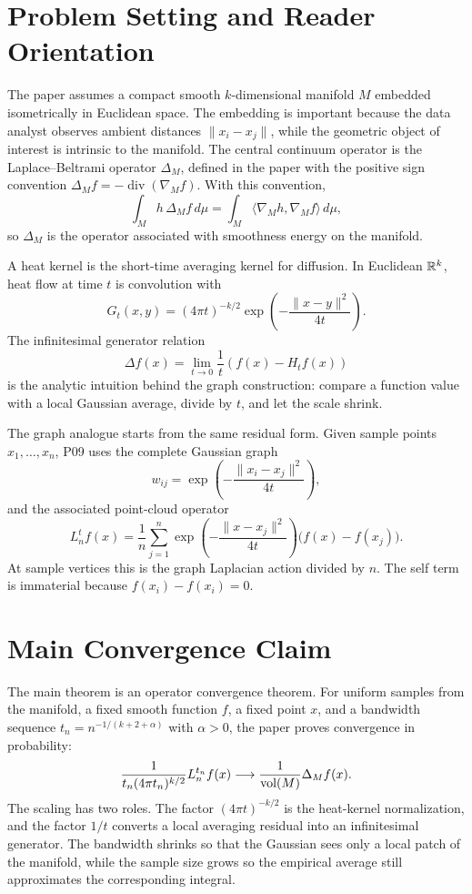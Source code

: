 \documentclass[11pt]{article}
\begin{document}
\section{Problem Setting and Reader Orientation}

The paper assumes a compact smooth \(k\)-dimensional manifold \(M\) embedded
isometrically in Euclidean space. The embedding is important because the data
analyst observes ambient distances \(\|x_i-x_j\|\), while the geometric object
of interest is intrinsic to the manifold. The central continuum operator is the
Laplace--Beltrami operator \(\Delta_M\), defined in the paper with the positive
sign convention \(\Delta_M f=-\operatorname{div}(\nabla_M f)\). With this
convention,
\[
  \int_M h\,\Delta_M f\,d\mu
  =
  \int_M \langle \nabla_M h,\nabla_M f\rangle\,d\mu ,
\]
so \(\Delta_M\) is the operator associated with smoothness energy on the
manifold.

A heat kernel is the short-time averaging kernel for diffusion. In Euclidean
\(\mathbb{R}^k\), heat flow at time \(t\) is convolution with
\[
  G_t(x,y)=(4\pi t)^{-k/2}
  \exp\!\left(-\frac{\|x-y\|^2}{4t}\right).
\]
The infinitesimal generator relation
\[
  \Delta f(x)=\lim_{t\to 0}\frac{1}{t}\left(f(x)-H_t f(x)\right)
\]
is the analytic intuition behind the graph construction: compare a function
value with a local Gaussian average, divide by \(t\), and let the scale shrink.

The graph analogue starts from the same residual form. Given sample points
\(x_1,\ldots,x_n\), P09 uses the complete Gaussian graph
\[
  w_{ij}=\exp\!\left(-\frac{\|x_i-x_j\|^2}{4t}\right),
\]
and the associated point-cloud operator
\[
  L_n^t f(x)
  =
  \frac{1}{n}\sum_{j=1}^n
  \exp\!\left(-\frac{\|x-x_j\|^2}{4t}\right)
  \bigl(f(x)-f(x_j)\bigr).
\]
At sample vertices this is the graph Laplacian action divided by \(n\). The
self term is immaterial because \(f(x_i)-f(x_i)=0\).

\section{Main Convergence Claim}

The main theorem is an operator convergence theorem. For uniform samples from
the manifold, a fixed smooth function \(f\), a fixed point \(x\), and a
bandwidth sequence \(t_n=n^{-1/(k+2+\alpha)}\) with \(\alpha>0\), the paper
proves convergence in probability:
\[
  \frac{1}{t_n(4\pi t_n)^{k/2}}L_n^{t_n} f(x)
  \longrightarrow
  \frac{1}{\operatorname{vol}(M)}\Delta_M f(x).
\]
The scaling has two roles. The factor \((4\pi t)^{-k/2}\) is the heat-kernel
normalization, and the factor \(1/t\) converts a local averaging residual into
an infinitesimal generator. The bandwidth shrinks so that the Gaussian sees
only a local patch of the manifold, while the sample size grows so the
empirical average still approximates the corresponding integral.
\end{document}
